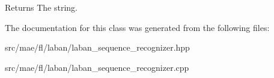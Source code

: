 \begin{DoxyReturn}{Returns}
The string. 
\end{DoxyReturn}


The documentation for this class was generated from the following files\-:\begin{DoxyCompactItemize}
\item 
src/mae/fl/laban/laban\-\_\-sequence\-\_\-recognizer.\-hpp\item 
src/mae/fl/laban/laban\-\_\-sequence\-\_\-recognizer.\-cpp\end{DoxyCompactItemize}
